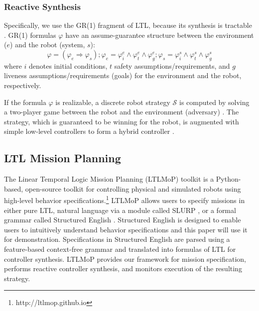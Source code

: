 \subsubsection*{Reactive Synthesis}
Specifically, we use the GR(1) fragment of LTL, because its synthesis is tractable \cite{piterman_06}. GR(1) formulas $\varphi$ have an assume-guarantee structure between the environment ($e$) and the robot (system, $s$):
$$
\varphi = (\varphi_e \Rightarrow \varphi_s); \varphi_e = \varphi_i^e \wedge \varphi_t^e \wedge \varphi_g^e; \varphi_s = \varphi_i^s \wedge \varphi_t^s \wedge \varphi_g^s
$$
where $i$ denotes initial conditions, $t$ safety assumptions/requirements, and $g$ liveness assumptions/requirements (goals) for the environment and the robot, respectively.


If the formula $\varphi$ is realizable, a discrete robot strategy $\mathcal{S}$ is computed by solving a two-player game between the robot and the environment (adversary) \cite{piterman_06}. The strategy, which is guaranteed to be winning for the robot, is augmented with simple low-level controllers to form a hybrid controller \cite{KGFP_TRO09}.

\subsection{LTL Mission Planning}\label{preliminariesB}

The Linear Temporal Logic Mission Planning (LTLMoP) toolkit \cite{Finucane2010} is a Python-based, open-source toolkit for controlling physical and simulated robots using high-level behavior specifications.\footnote{http://ltlmop.github.io} 
LTLMoP allows users to specify missions in either pure LTL, natural language via a module called SLURP \cite{RamanRSS2013}, or a formal grammar called Structured English \cite{JFRKGICRA12}. 
Structured English is designed to enable users to intuitively understand behavior specifications and this paper will use it for demonstration. 
Specifications in Structured English are parsed using a feature-based context-free grammar and translated into formulas of LTL for controller synthesis. 
LTLMoP provides our framework for mission specification, performs reactive controller synthesis, and monitors execution of the resulting strategy. 
